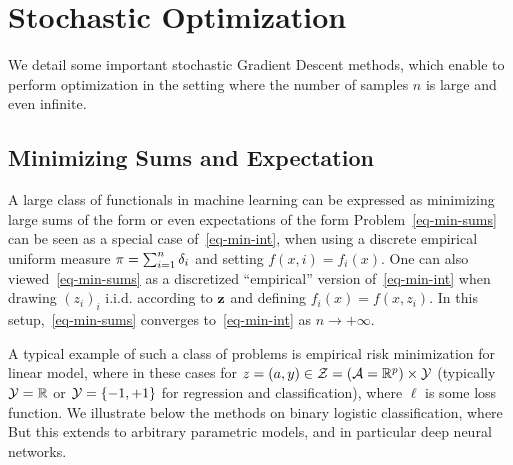 
\section{Stochastic Optimization}
\label{sec-stochastic-optim}

We detail some important stochastic Gradient Descent methods, which enable to perform optimization in the setting where the number of samples $n$ is large and even infinite. 


\subsection{Minimizing Sums and Expectation}

A large class of functionals in machine learning can be expressed as minimizing large sums of the form
or even expectations of the form
Problem~\eqref{eq-min-sums} can be seen as a special case of~\eqref{eq-min-int}, when using a discrete empirical uniform measure $\pi = \sum_{i=1}^n \delta_i$ and setting $f(x,i)=f_i(x)$. One can also viewed~\eqref{eq-min-sums} as a discretized ``empirical'' version of~\eqref{eq-min-int} when drawing $(z_i)_i$ i.i.d. according to $\mathrm{\bf z}$ and defining $f_i(x)=f(x,z_i)$. In this setup,~\eqref{eq-min-sums} converges to~\eqref{eq-min-int} as $n \rightarrow +\infty$.

A typical example of such a class of problems is empirical risk minimization for linear model, where in these cases
for $z=(a,y) \in \mathcal{Z} = (\mathcal{A}=\mathbb{R}^p) \times \mathcal{Y}$ (typically $\mathcal{Y}=\mathbb{R}$ or $\mathcal{Y}=\{-1,+1\}$ for regression and classification), where $\ell$ is some loss function. 
%
We illustrate below the methods on binary logistic classification, where
But this extends to arbitrary parametric models, and in particular deep neural networks.

